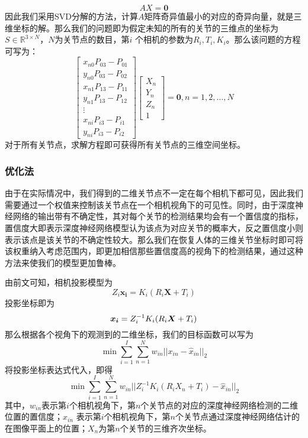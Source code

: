 \begin{equation}
    AX = \bm{0}
\end{equation}
因此我们采用SVD分解的方法，计算$A$矩阵奇异值最小的对应的奇异向量，就是三维坐标的解。那么我们的问题即为假定未知的所有的关节的三维点的坐标为$S\in \mathbb{R}^{3\times N}$，$N$为关节点的数目，第$i$ 个相机的参数为$R_i,T_i,K_i$。那么该问题的方程可写为：
\begin{equation}
    \left[ \begin{array}{c}
        x_{n0}P_{03} - P_{01} \\ 
        y_{n0}P_{03} - P_{02} \\
        x_{n1}P_{13} - P_{11} \\ 
        y_{n1}P_{13} - P_{12} \\
        \vdots \\
        x_{ni}P_{i3} - P_{i1} \\ 
        y_{ni}P_{i3} - P_{i2} 
    \end{array}\right] \left[ \begin{array}{c}
        X_n \\
        Y_n\\
        Z_n\\
        1 
    \end{array}\right]  = \bm{0}, n = 1,2,\ldots,N
\end{equation}
对于所有关节点，求解方程即可获得所有关节点的三维空间坐标。

\subsubsection{优化法}
由于在实际情况中，我们得到的二维关节点不一定在每个相机下都可见，因此我们需要通过一个权值来控制该关节点在一个相机视角下的可见性。同时，由于深度神经网络的输出带有不确定性，其对每个关节的检测结果均会有一个置信度的指标，置信度大即表示深度神经网络模型认为该点为对应关节的概率大，反之置信度小则表示该点是该关节的不确定性较大。那么我们在恢复人体的三维关节坐标时即可将该权重纳入考虑范围内，即更加相信那些置信度高的视角下的检测结果，通过这种方法来使我们的模型更加鲁棒。

由前文可知，相机投影模型为
\begin{equation}
    Z_i \bm{x_i} = K_i(R_i\bm{X} + T_i)
\end{equation}
投影坐标即为
\begin{equation}
    \bm{x_i} = Z_i^{-1}K_i(R_i{\bm{X}} + T_i)    
\end{equation}
那么根据各个视角下的观测到的二维坐标，我们的目标函数可以写为
\begin{equation}
    \min \sum^I_{i=1} \sum_{n=1}^N w_{in}||x_{in} - \hat x_{in}||_2
\end{equation}
将投影坐标表达式代入，即得
\begin{equation}
    \min \sum^I_{i=1} \sum_{n=1}^N w_{in}||Z_i^{-1}K_i(R_iX_n + T_i) - \hat x_{in}||_2  
\end{equation}
\newcommand{\mi}{第\(i\)个}
\newcommand{\mn}{第\(n\)个}
其中，$w_{in}$表示\mi 相机视角下，\mn 关节点的对应的深度神经网络检测的二维位置的置信度；$\hat x_{in}$ 表示\mi 相机视角下，\mn 关节点通过深度神经网络估计的在图像平面上的位置；$X_n$为\mn 关节的三维齐次坐标。

